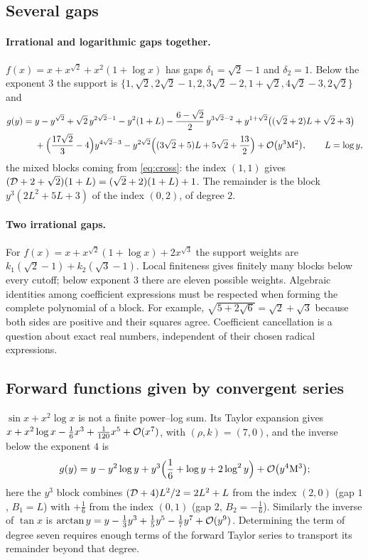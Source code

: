 \subsection{Several gaps}

\paragraph{Irrational and logarithmic gaps together.} $f(x)=x+x^{\sqrt2}+x^2(1+\log x)$ has gaps $\delta_1=\sqrt2-1$ and $\delta_2=1$. Below the exponent $3$ the support is $\{1,\sqrt2,2\sqrt2-1,2,3\sqrt2-2,1+\sqrt2,4\sqrt2-3,2\sqrt2\}$ and
\begin{align*}
 g(y)={}&y-y^{\sqrt2}+\sqrt2\,y^{2\sqrt2-1}-y^2(1+L)-\frac{6-\sqrt2}{2}\,y^{3\sqrt2-2}+y^{1+\sqrt2}\bigl((\sqrt2+2)L+\sqrt2+3\bigr)\\
 &+\Bigl(\frac{17\sqrt2}{3}-4\Bigr)y^{4\sqrt2-3}-y^{2\sqrt2}\Bigl((3\sqrt2+5)L+5\sqrt2+\frac{13}{2}\Bigr)+\mathcal O\bigl(y^3\mathrm M^2\bigr),\qquad L=\log y ,
\end{align*}
the mixed blocks coming from \eqref{eq:cross}: the index $(1,1)$ gives $(\mathcal D+2+\sqrt2)(1+L)=(\sqrt2+2)(1+L)+1$. The remainder is the block $y^3(2L^2+5L+3)$ of the index $(0,2)$, of degree $2$.

\paragraph{Two irrational gaps.} For
$f(x)=x+x^{\sqrt2}(1+\log x)+2x^{\sqrt3}$ the support weights are
$k_1(\sqrt2-1)+k_2(\sqrt3-1)$. Local finiteness gives finitely many blocks
below every cutoff; below exponent $3$ there are eleven possible weights.
Algebraic identities among coefficient expressions must be respected when
forming the complete polynomial of a block. For example,
$\sqrt{5+2\sqrt6}=\sqrt2+\sqrt3$ because both sides are positive and their
squares agree. Coefficient cancellation is a question about exact real
numbers, independent of their chosen radical expressions.

\subsection{Forward functions given by convergent series}

$\sin x+x^2\log x$ is not a finite power--log sum. Its Taylor expansion gives $x+x^2\log x-\tfrac16x^3+\tfrac1{120}x^5+\mathcal O(x^7)$, with $(\rho,k)=(7,0)$, and the inverse below the exponent $4$ is
\[
 g(y)=y-y^2\log y+y^3\Bigl(\frac16+\log y+2\log^2y\Bigr)+\mathcal O\bigl(y^4\mathrm M^3\bigr);
\]
here the $y^3$ block combines $(\mathcal D+4)L^2/2=2L^2+L$ from the index $(2,0)$ (gap $1$, $B_1=L$) with $+\tfrac16$ from the index $(0,1)$ (gap $2$, $B_2=-\tfrac16$). Similarly the inverse of $\tan x$ is $\arctan y=y-\tfrac13y^3+\tfrac15y^5-\tfrac17y^7+\mathcal O(y^9)$. Determining the term of degree seven requires enough terms of the forward Taylor series to transport its remainder beyond that degree.

